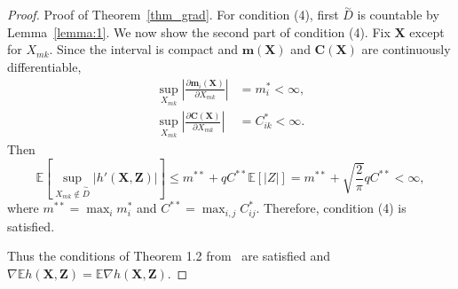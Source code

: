 \documentclass[paper=letter]{scrartcl}
\newcommand{\E}{\mathbb{E}}
\begin{document}
\begin{proof}{Proof of Theorem~\ref{thm_grad}.}
For condition (4), first $\overset{\sim}{D}$ is countable by Lemma~\ref{lemma:1}. 
We now show the second part of condition (4).
Fix $\bm{X}$ except for $X_{mk}$. Since the interval is compact and $\bm{m}(\bm{X})$ and $\bm{C}(\bm{X})$ 
are continuously differentiable,
\begin{equation*}
\begin{split}
\sup_{X_{mk}} \left\lvert \frac{\partial\bm{m}_i(\bm{X})}{\partial X_{mk}} \right\rvert &= m_i^* < \infty, \\
\sup_{X_{mk}} \left\lvert \frac{\partial\bm{C}(\bm{X})}{\partial X_{mk}} \right\rvert &= C_{ik}^* < \infty.
\end{split}
\end{equation*}
Then
\begin{equation*}
\E\left[\sup_{X_{mk} \notin \overset{\sim}{D}} \lvert h'(\bm{X}, \bm{Z}) \rvert \right] \leq m^{**} + q C^{**} \E[\lvert Z \rvert]
= m^{**} + \sqrt{\frac{2}{\pi}} q C^{**} < \infty,
\end{equation*}
where $m^{**}=\max_i m^*_i$ and $C^{**}=\max_{i,j} C^*_{ij}$. Therefore, condition (4) is satisfied.

Thus the conditions of Theorem 1.2 from~\cite{Glasserman1991} are satisfied and 
$\nabla \mathbb{E} h(\bm{X},\bm{Z}) = \mathbb{E} \nabla h(\bm{X},\bm{Z})$.
\end{proof}
\end{document}
